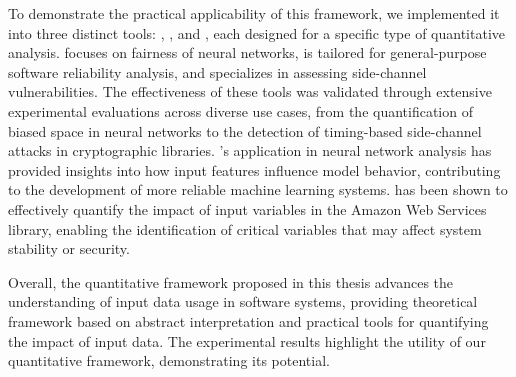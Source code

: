 To demonstrate the practical applicability of this framework, we implemented it into three distinct tools: \libra, \impatto, and \timesec, each designed for a specific type of quantitative analysis. \libra{} focuses on fairness of neural networks, \impatto{} is tailored for general-purpose software reliability analysis, and \timesec{} specializes in assessing side-channel vulnerabilities. The effectiveness of these tools was validated through extensive experimental evaluations across diverse use cases, from the quantification of biased space in neural networks to the detection of timing-based side-channel attacks in cryptographic libraries.
\libra's application in neural network analysis has provided insights into how input features influence model behavior, contributing to the development of more reliable machine learning systems.
\timesec{} has been shown to effectively quantify the impact of input variables in the Amazon Web Services \bignum{} library, enabling the identification of critical variables that may affect system stability or security.

Overall, the quantitative framework proposed in this thesis advances the understanding of input data usage in software systems, providing theoretical framework based on abstract interpretation and practical tools for quantifying the impact of input data. The experimental results highlight the utility of our quantitative framework, demonstrating its potential.

